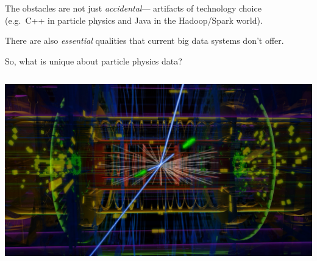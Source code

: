 \documentclass[aspectratio=169]{beamer}
\begin{document}
\begin{frame}{}
\vspace{1 cm}
\large
\begin{center}
The obstacles are not just {\it accidental}--- artifacts of technology choice \\ (e.g.\ C++ in particle physics and Java in the Hadoop/Spark world).

\vspace{1 cm}
There are also {\it essential} qualities that current big data systems don't offer.

\vspace{1 cm}
\end{center}
\end{frame}

\begin{frame}{So, what is unique about particle physics data?}

\begin{columns}
\vspace{0.11 cm}
\includegraphics[width=\linewidth]{complex-atlas-collision-art.jpg}
\end{columns}

\vspace{-8.7 cm}

\vspace{0.5 cm}

\vspace{3.3 cm}

\vspace{8.7 cm}
\end{frame}
\end{document}

